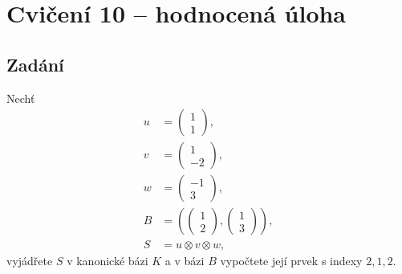 \documentclass[]{article}
\begin{document}
\section{Cvičení 10 – hodnocená úloha}
\subsection{Zadání}
Nechť
\begin{align*}
    u &= \begin{pmatrix}
        1 \\ 1
    \end{pmatrix},
    \\
    v &= \begin{pmatrix}
        1 \\ -2
    \end{pmatrix},
    \\
    w &= \begin{pmatrix}
        -1 \\ 3
    \end{pmatrix},
    \\
    B &= ( \begin{pmatrix}
        1 \\ 2
    \end{pmatrix},
    \begin{pmatrix}
        1 \\ 3
    \end{pmatrix} ),
    \\
    S &= u \otimes v \otimes w,
\end{align*}
vyjádřete $S$ v kanonické bázi $K$ a v bázi $B$ vypočtete její prvek s indexy $2, 1, 2$.
\end{document}
